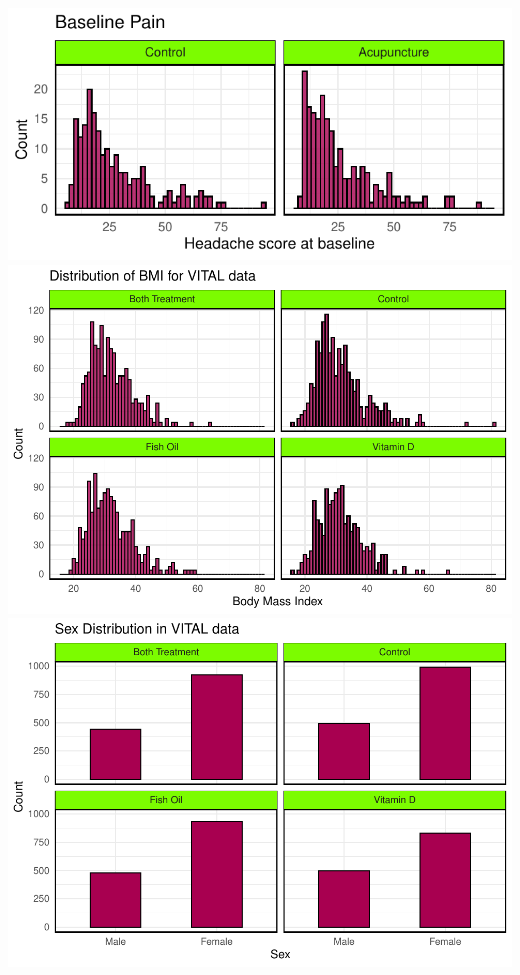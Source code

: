 \documentclass{article}
\begin{document}
\includegraphics{Final_Report_files/figure-latex/unnamed-chunk-6-1.pdf}
\includegraphics{Final_Report_files/figure-latex/unnamed-chunk-6-2.pdf}
\includegraphics{Final_Report_files/figure-latex/unnamed-chunk-6-3.pdf}
\end{document}
